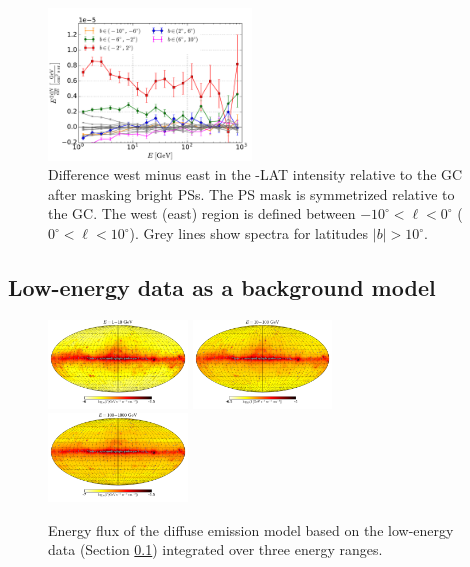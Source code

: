 \begin{figure}[h]
\hspace{-2mm}
 \includegraphics[width=0.48\textwidth]{plots/Difference_data_for_different_latitudes.pdf}
 \caption{Difference west minus east in the \Fermi-LAT intensity relative to the GC after masking bright PSs.
 The PS mask is symmetrized relative to the GC.
 The west (east) region is defined between $-10^\circ < \ell <0^\circ$ ($0^\circ < \ell <10^\circ$).
 Grey lines show spectra for latitudes $|b| > 10^\circ$. 
 }
 \label{fig:data_diff}
\end{figure}

\subsection{Low-energy data as a background model}
\label{sec:le_data_model}

\begin{figure}[t]
\includegraphics[width=0.33\textwidth]{plots/Mollweide_LowE_model_03-10GeV_flux_source_range_0_log.pdf}
\includegraphics[width=0.33\textwidth]{plots/Mollweide_LowE_model_03-10GeV_flux_source_range_1_log.pdf}
\includegraphics[width=0.33\textwidth]{plots/Mollweide_LowE_model_03-10GeV_flux_source_range_2_log.pdf}
\caption{Energy flux of the diffuse emission model based on the low-energy data (Section \ref{sec:le_data_model})
integrated over three energy ranges. }
\label{fig:Maps_lowE_model}
\end{figure}


